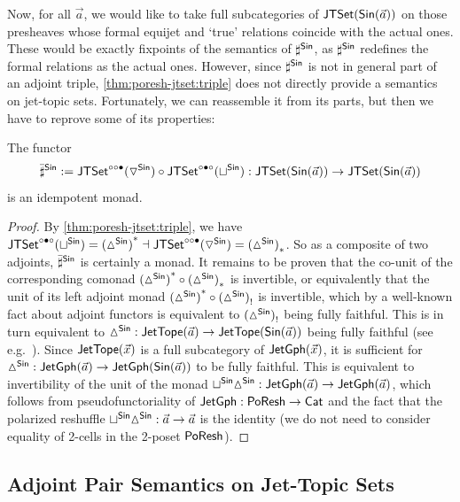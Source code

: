 \documentclass[a4paper]{memoir}
\begin{document}
{Now, for all $\vec a$, we would like to take full subcategories of $\mathsf{JTSet}({\mathsf{Sin}}(\vec a))$ on those presheaves whose formal equijet and `true' relations coincide with the actual ones.
These would be exactly fixpoints of the semantics of $\sharp^{\mathsf{Sin}}$, as $\sharp^{\mathsf{Sin}}$ redefines the formal relations as the actual ones.
However, since $\sharp^{\mathsf{Sin}}$ is not in general part of an adjoint triple, \cref{thm:poresh-jtset:triple} does not directly provide a semantics on jet-topic sets.
Fortunately, we can reassemble it from its parts, but then we have to reprove some of its properties:
\begin{proposition}
	The functor
	\[
		{\bar \sharp}^{\mathsf{Sin}} := \mathsf{JTSet}^{\circ \circ \bullet}({\triangledown}^{\mathsf{Sin}}) \circ \mathsf{JTSet}^{\circ \bullet \circ}({\sqcup}^{\mathsf{Sin}}) : \mathsf{JTSet}({\mathsf{Sin}}(\vec a)) \to \mathsf{JTSet}({\mathsf{Sin}}(\vec a))
	\]
	is an idempotent monad.
\end{proposition}
\begin{proof}
	By \cref{thm:poresh-jtset:triple}, we have $\mathsf{JTSet}^{\circ \bullet \circ}({\sqcup}^{\mathsf{Sin}}) = {({\vartriangle}^{\mathsf{Sin}})}^* \dashv \mathsf{JTSet}^{\circ \circ \bullet}({\triangledown}^{\mathsf{Sin}}) = {({\vartriangle}^{\mathsf{Sin}})}_*$.
	So as a composite of two adjoints, ${\bar \sharp}^{\mathsf{Sin}}$ is certainly a monad.
	It remains to be proven that the co-unit of the corresponding comonad ${({\vartriangle}^{\mathsf{Sin}})}^* \circ {({\vartriangle}^{\mathsf{Sin}})}_*$ is invertible,
	or equivalently that the unit of its left adjoint monad ${({\vartriangle}^{\mathsf{Sin}})}^* \circ {({\vartriangle}^{\mathsf{Sin}})}_!$ is invertible,
	which by a well-known fact about adjoint functors \cite[v141, prop.\ 3.4]{nlab:adjoint-functor} is equivalent to ${({\vartriangle}^{\mathsf{Sin}})}_!$ being fully faithful.
	This is in turn equivalent to ${\vartriangle}^{\mathsf{Sin}} : \mathsf{JetTope}(\vec a) \to \mathsf{JetTope}({\mathsf{Sin}}(\vec a))$ being fully faithful (see e.g.\ \cite[v4, thm.\ 2.3.4]{transpension-techreport}).
	Since $\mathsf{JetTope}(\vec x)$ is a full subcategory of $\mathsf{JetGph}(\vec x)$,
	it is sufficient for ${\vartriangle}^{\mathsf{Sin}} : \mathsf{JetGph}(\vec a) \to \mathsf{JetGph}({\mathsf{Sin}}(\vec a))$ to be fully faithful.
	This is equivalent to invertibility of the unit of the monad ${\sqcup}^{\mathsf{Sin}} {\vartriangle}^{\mathsf{Sin}} : \mathsf{JetGph}(\vec a) \to \mathsf{JetGph}(\vec a)$, which follows from pseudofunctoriality of $\mathsf{JetGph} : \mathsf{PoResh} \to {\mathsf{Cat}}$ and the fact that the polarized reshuffle ${\sqcup}^{\mathsf{Sin}} {\vartriangle}^{\mathsf{Sin}} : \vec a \to \vec a$ is the identity (we do not need to consider equality of 2-cells in the 2-poset $\mathsf{PoResh}$).
\end{proof}

\subsection{Adjoint Pair Semantics on Jet-Topic Sets} \label{sec:poresh-jtset:pair}
} %
\end{document}
